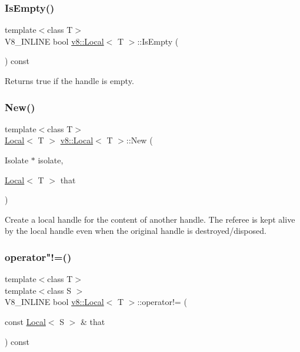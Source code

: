 \subsubsection{\texorpdfstring{Is\+Empty()}{IsEmpty()}}
{\footnotesize\ttfamily template$<$class T$>$ \\
V8\+\_\+\+I\+N\+L\+I\+NE bool \mbox{\hyperlink{classv8_1_1Local}{v8\+::\+Local}}$<$ T $>$\+::Is\+Empty (\begin{DoxyParamCaption}{ }\end{DoxyParamCaption}) const\hspace{0.3cm}{\ttfamily [inline]}}

Returns true if the handle is empty. \mbox{\label{classv8_1_1Local_a1b3c386fb10d9e8f67aecec9174de1fa}} 
\subsubsection{\texorpdfstring{New()}{New()}}
{\footnotesize\ttfamily template$<$class T$>$ \\
\mbox{\hyperlink{classv8_1_1Local}{Local}}$<$ T $>$ \mbox{\hyperlink{classv8_1_1Local}{v8\+::\+Local}}$<$ T $>$\+::New (\begin{DoxyParamCaption}\item[{Isolate $\ast$}]{isolate,  }\item[{\mbox{\hyperlink{classv8_1_1Local}{Local}}$<$ T $>$}]{that }\end{DoxyParamCaption})\hspace{0.3cm}{\ttfamily [static]}}

Create a local handle for the content of another handle. The referee is kept alive by the local handle even when the original handle is destroyed/disposed. \mbox{\label{classv8_1_1Local_a3b2ae1c0415d319099ebc2fd059dbb10}} 
\subsubsection{\texorpdfstring{operator"!=()}{operator!=()}}
{\footnotesize\ttfamily template$<$class T$>$ \\
template$<$class S $>$ \\
V8\+\_\+\+I\+N\+L\+I\+NE bool \mbox{\hyperlink{classv8_1_1Local}{v8\+::\+Local}}$<$ T $>$\+::operator!= (\begin{DoxyParamCaption}\item[{const \mbox{\hyperlink{classv8_1_1Local}{Local}}$<$ S $>$ \&}]{that }\end{DoxyParamCaption}) const\hspace{0.3cm}{\ttfamily [inline]}}

